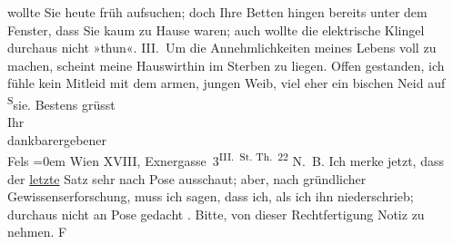\begin{ledgroupsized}[t]{13cm}
                    wollte Sie heute früh aufsuchen; doch Ihre Betten hingen bereits {\pb}unter dem Fenster, dass Sie kaum zu Hause waren;
                    auch wollte die elektrische Klingel durchaus nicht »thun«.\pend
           \pstart
           III. Um die Annehmlichkeiten meines Lebens voll zu machen, scheint meine Hauswirthin im Sterben zu
                    liegen. Offen gestanden, ich fühle kein Mitleid mit dem armen, jungen Weib, viel
                    eher ein bischen Neid auf \substVorne{}\textsuperscript{S}\substDazwischen{}s\substHinten{}ie.\pend
           \pstart
           Bestens grüsst{\\[\baselineskip]}Ihr{\\[\baselineskip]}dankbarergebener{\\[\baselineskip]}\spacefill\mbox{Fels}\pend
           \leftskip=0em{}\pstart
           \noindent{}Wien XVIII, Exnergasse 3\textsuperscript{III. St. Th. 22}\pend
           \pstart
           N. B. Ich merke jetzt, dass der \uline{letzte} Satz
                        sehr nach Pose ausschaut; aber, nach gründlicher Gewissenserforschung, muss
                        ich sagen, dass ich, als ich ihn niederschrieb; durchaus nicht an Pose
                        gedacht \label{T_L00326_1v}\label{T_L00326_1h}. Bitte, von dieser
                        Rechtfertigung Notiz zu nehmen. \spacefill\mbox{F}\pend
           \endnumbering{}\end{ledgroupsized}  \newcommand{\dateiname}{L00326}\newcommand{\titel}{Friedrich M. Fels an Arthur Schnitzler, [17. 5. 1894]}\newcommand{\editorInnen}{Martin Anton Müller und Gerd-Hermann Susen}
      